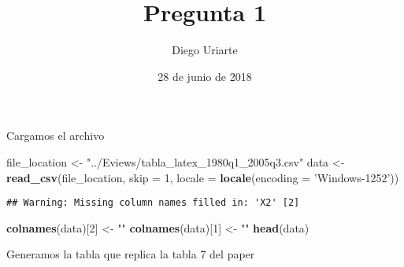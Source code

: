 \documentclass[]{article}
\title{Pregunta 1}
\author{Diego Uriarte}
\date{28 de junio de 2018}
\newenvironment{Shaded}{\begin{snugshade}}{\end{snugshade}}
\newcommand{\KeywordTok}[1]{\textcolor[rgb]{0.13,0.29,0.53}{\textbf{#1}}}
\newcommand{\DataTypeTok}[1]{\textcolor[rgb]{0.13,0.29,0.53}{#1}}
\newcommand{\DecValTok}[1]{\textcolor[rgb]{0.00,0.00,0.81}{#1}}
\newcommand{\StringTok}[1]{\textcolor[rgb]{0.31,0.60,0.02}{#1}}
\newcommand{\NormalTok}[1]{#1}
\begin{document}
\maketitle

Cargamos el archivo

\begin{Shaded}
\begin{Highlighting}[]
\NormalTok{file_location <-}\StringTok{ "../Eviews/tabla_latex_1980q1_2005q3.csv"}
\NormalTok{data <-}\StringTok{ }\KeywordTok{read_csv}\NormalTok{(file_location, }\DataTypeTok{skip =} \DecValTok{1}\NormalTok{, }\DataTypeTok{locale =} \KeywordTok{locale}\NormalTok{(}\DataTypeTok{encoding =} \StringTok{'Windows-1252'}\NormalTok{))}
\end{Highlighting}
\end{Shaded}

\begin{verbatim}
## Warning: Missing column names filled in: 'X2' [2]
\end{verbatim}

\begin{Shaded}
\begin{Highlighting}[]
\KeywordTok{colnames}\NormalTok{(data)[}\DecValTok{2}\NormalTok{] <-}\StringTok{ ""}
\KeywordTok{colnames}\NormalTok{(data)[}\DecValTok{1}\NormalTok{] <-}\StringTok{ ""}
\KeywordTok{head}\NormalTok{(data)}
\end{Highlighting}
\end{Shaded}

Generamos la tabla que replica la tabla 7 del paper

\end{document}
